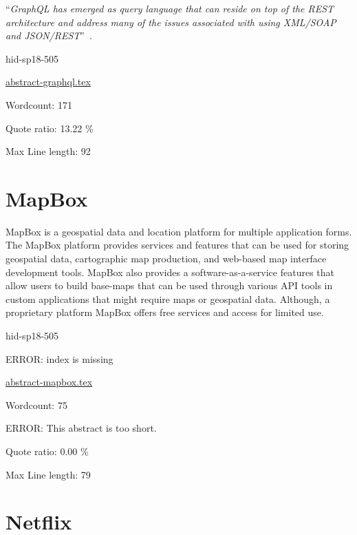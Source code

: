 \color{blue}``\emph{GraphQL has emerged as query language that can reside on top of the REST
architecture and address many of the issues associated with using XML/SOAP and
JSON/REST}''\color{black}~\cite{hid-sp18-505-GraphQL2018}.


\begin{IU}

hid-sp18-505

\href{https://github.com/cloudmesh-community/hid-sp18-505/blob/master//technology/abstract-graphql.tex}{abstract-graphql.tex}

 

Wordcount: 171


Quote ratio: 13.22 \%
 
Max Line length: 92
\end{IU}

\section{MapBox}

MapBox is a geospatial data and location platform for multiple application
forms.  The MapBox platform provides services and features that can be used for
storing geospatial data, cartographic map production, and web-based map
interface development tools.  MapBox also provides a software-as-a-service
features that allow users to build base-maps that can be used through various
API tools in custom applications that might require maps or geospatial
data.  Although, a proprietary platform MapBox offers free services and access
for limited use\cite{hid-sp18-505-MapBox2018}.


\begin{IU}

hid-sp18-505

ERROR: index is missing

\href{https://github.com/cloudmesh-community/hid-sp18-505/blob/master//technology/abstract-mapbox.tex}{abstract-mapbox.tex}

 

Wordcount: 75

ERROR: This abstract is too short.


Quote ratio: 0.00 \%
 
Max Line length: 79
\end{IU}

\section{Netflix}

